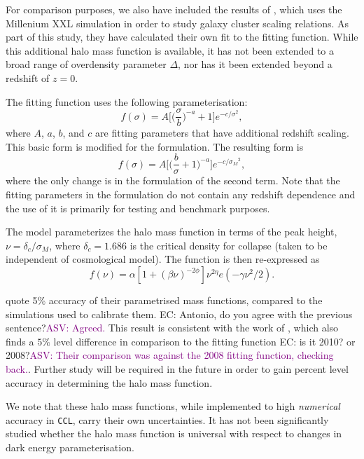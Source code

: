 \documentclass[\docopts]{\docclass}
\newcommand{\asv}[1]{\textcolor{purple}{ASV: #1}}
\newcommand{\elisa}[1]{\textcolor{green!10!orange!90!}{EC: #1}}
\newcommand{\ccl}{{\tt CCL}\xspace}
\begin{document}
For comparison purposes, we also have included the results of \citet{Angulo2012}, which uses the Millenium XXL simulation in order to study galaxy cluster scaling relations. As part of this study, they have calculated their own fit to the \citet{Tinker2010} fitting function. While this additional halo mass function is available, it has not been extended to a broad range of overdensity parameter $\Delta$, nor has it been extended beyond a redshift of $z = 0$.

The \citet{Tinker2008} fitting function uses the following parameterisation:
\begin{equation}
f(\sigma)=A\Big[\Big(\frac{\sigma}{b}\Big)^{-a}+1\Big]e^{-c/{\sigma}^2},
\end{equation}
where $A$, $a$, $b$, and $c$ are fitting parameters that have additional redshift scaling. This basic form is modified for the \citet{Angulo2012} formulation. The resulting form is
\begin{equation}
f(\sigma)=A\Big[\Big(\frac{b}{\sigma}+1\Big)^{-a}\Big]e^{-c/{\sigma_M}^2},
\end{equation}
where the only change is in the formulation of the second term. Note that the fitting parameters in the \citet{Angulo2012} formulation do not contain any redshift dependence and the use of it is primarily for testing and benchmark purposes.

The \citet{Tinker2010} model parameterizes the halo mass function in terms of the peak height, $\nu = \delta_c/\sigma_M$, where $\delta_c=1.686$ is the critical density for collapse (taken to be independent of cosmological model). The function is then re-expressed as
\begin{equation}
  f(\nu) = \alpha[1+(\beta\nu)^{-2\phi}]\nu^{2\eta}e(-\gamma\nu^2/2).
  \label{eq:tinkerf}
\end{equation}

\citet{Tinker2008,Tinker2010} quote 5\% accuracy of their parametrised mass functions, compared to the simulations used to calibrate them. \elisa{Antonio, do you agree with the previous sentence?}\asv{Agreed.} This result is consistent with the work of \citet{Watson2013}, which also finds a $5\%$ level difference in comparison to the \citet{Tinker2008} fitting function \elisa{is it 2010? or 2008?}\asv{Their comparison was against the 2008 fitting function, checking back.}. Further study will be required in the future in order to gain percent level accuracy in determining the halo mass function.

We note that these halo mass functions, while implemented to high {\em numerical} accuracy in \ccl, carry their own uncertainties. It has not been significantly studied whether the halo mass function is universal with respect to changes in dark energy parameterisation.
\end{document}
